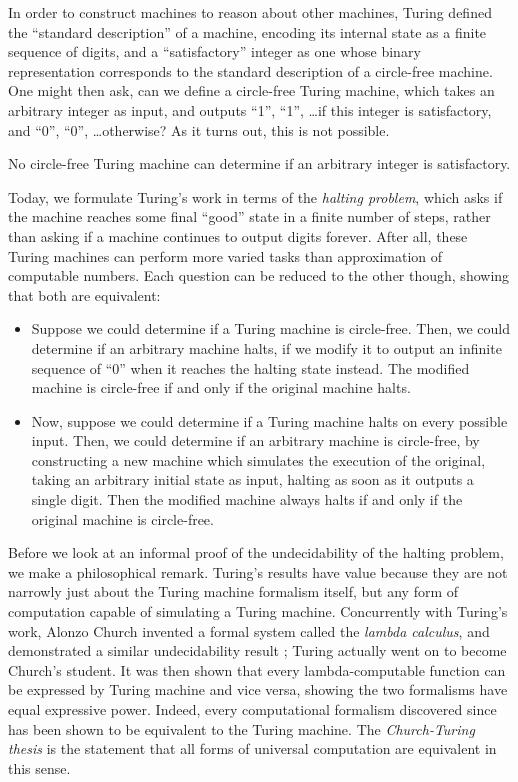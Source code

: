 \documentclass[../generics]{subfiles}
\begin{document}
In order to construct machines to reason about other machines, Turing defined the ``standard description'' of a machine, encoding its internal state as a finite sequence of digits, and a ``satisfactory'' integer as one whose binary representation corresponds to the standard description of a circle-free machine. One might then ask, can we define a circle-free Turing machine, which takes an arbitrary integer as input, and outputs ``1'', ``1'', \ldots if this integer is satisfactory, and ``0'', ``0'', \ldots otherwise? As it turns out, this is not possible.
\begin{theorem}
No circle-free Turing machine can determine if an arbitrary integer is satisfactory.
\end{theorem}
Today, we formulate Turing's work in terms of the \emph{halting problem}, which asks if the machine reaches some final ``good'' state in a finite number of steps, rather than asking if a machine continues to output digits forever. After all, these Turing machines can perform more varied tasks than approximation of computable numbers. Each question can be reduced to the other though, showing that both are equivalent:
\begin{itemize}
\item Suppose we could determine if a Turing machine is circle-free. Then, we could determine if an arbitrary machine halts, if we modify it to output an infinite sequence of ``0'' when it reaches the halting state instead. The modified machine is circle-free if and only if the original machine halts.
\item Now, suppose we could determine if a Turing machine halts on every possible input. Then, we could determine if an arbitrary machine is circle-free, by constructing a new machine which simulates the execution of the original, taking an arbitrary initial state as input, halting as soon as it outputs a single digit. Then the modified machine always halts if and only if the original machine is circle-free.
\end{itemize}

Before we look at an informal proof of the undecidability of the halting problem, we make a philosophical remark. Turing's results have value because they are not narrowly just about the Turing machine formalism itself, but any form of computation capable of simulating a Turing machine. Concurrently with Turing's work, Alonzo Church invented a formal system called the \emph{lambda calculus}, and demonstrated a similar undecidability result \cite{church}; Turing actually went on to become Church's student. It was then shown that every lambda-computable function can be expressed by Turing machine and vice versa, showing the two formalisms have equal expressive power. Indeed, every computational formalism discovered since has been shown to be equivalent to the Turing machine. The \emph{Church-Turing thesis} is the statement that all forms of universal computation are equivalent in this sense.
\end{document}

